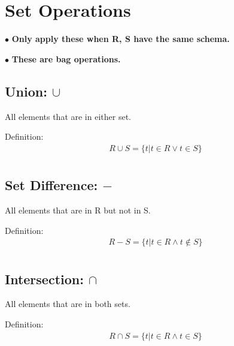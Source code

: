 \documentclass[twoside]{article}
\begin{document}
\section*{Set Operations}
$\bullet$ \textbf{Only apply these when R, S have the same schema.}

$\bullet$ \textbf{These are bag operations.}

\subsection*{Union: $\cup$}
All elements that are in either set.

Definition:
\begin{gather*}
    R \cup S = \{t | t \in R \vee t \in S\} \\
\end{gather*}

\subsection*{Set Difference: $-$}
All elements that are in R but not in S.

Definition:
\begin{gather*}
    R - S = \{t | t \in R \wedge t \notin S\} \\
\end{gather*}

\subsection*{Intersection: $\cap$}
All elements that are in both sets.

Definition:
\begin{gather*}
    R \cap S = \{t | t \in R \wedge t \in S\} \\
\end{gather*}
\end{document}
